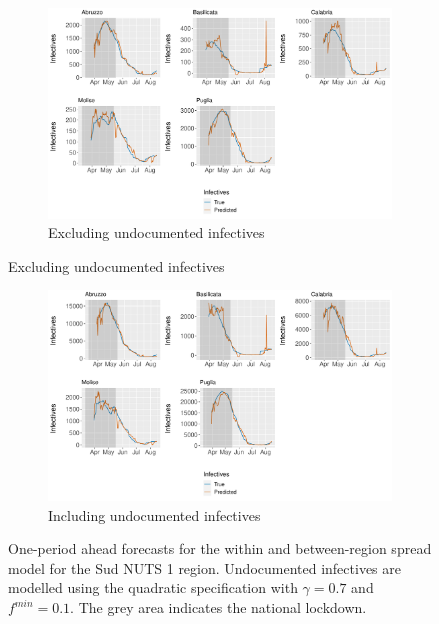 \documentclass[12pt]{article}
\begin{document}
\begin{appendices}
        \begin{figure}[H]
    	    \centering
    	    \begin{subfigure}{\textwidth}
    	      \centering
    	      \includegraphics[width=0.91\linewidth]{output/model_between_lag14_forecast_start20_Sud_rolling.pdf}
    	      \caption{Excluding undocumented infectives}
    	      \label{fig:forecast_between_sud_regular}
    	    \end{subfigure}
        \end{figure}
        \begin{figure}[H]\ContinuedFloat
    	    \begin{subfigure}{\textwidth}
    	      \centering
    	      \includegraphics[width=0.91\linewidth]{output/model_between_lag14_forecast_start20_Sud_UndocQuadratic_rolling.pdf}
    	      \caption{Including undocumented infectives}
    	      \label{fig:forecast_between_sud_undoc}
    	    \end{subfigure}
    	    \caption{One-period ahead forecasts for the within and between-region spread model for the Sud NUTS 1 region. Undocumented infectives are modelled using the quadratic specification with $\gamma = 0.7$ and $f^{min}=0.1$. The grey area indicates the national lockdown.}
    	    \label{fig:forecast_between_sud}
        \end{figure}
        

\end{appendices}
\end{document}
